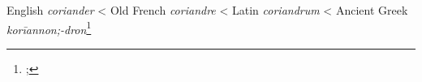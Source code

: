 \begin{etymology}\label{ety:coriander}
English \textit{coriander}
< Old French \textit{coriandre}
< Latin \textit{coriandrum}
< Ancient Greek \textit{korīannon;-dron}\footnote{; }
\end{etymology}